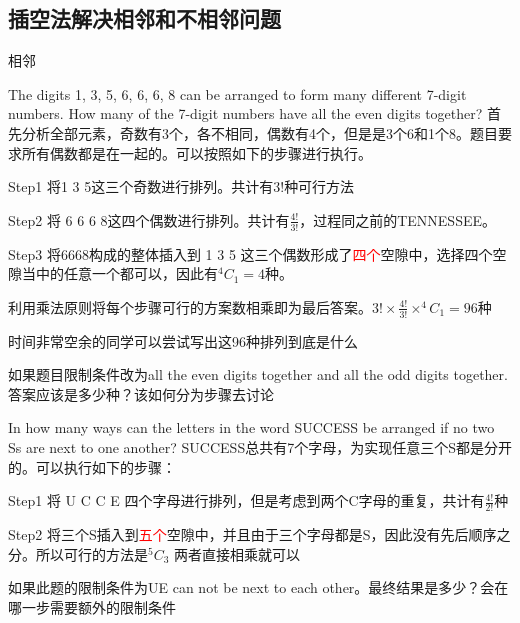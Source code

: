 \subsection*{插空法解决相邻和不相邻问题}
相邻
\begin{ExampleBox}
The digits 1, 3, 5, 6, 6, 6, 8 can be arranged to form many diﬀerent 7-digit numbers. How many of the 7-digit numbers have all the even digits together?
\tcblower
首先分析全部元素，奇数有3个，各不相同，偶数有4个，但是是3个6和1个8。题目要求所有偶数都是在一起的。可以按照如下的步骤进行执行。

Step1 将1 3 5这三个奇数进行排列。共计有$3!$种可行方法

Step2 将 6 6 6 8这四个偶数进行排列。共计有$\frac{4!}{3!}$，过程同之前的TENNESSEE。

Step3 将6668构成的整体插入到 1 3 5 这三个偶数形成了\textcolor{red}{四个}空隙中，选择四个空隙当中的任意一个都可以，因此有$^4C_1=4$种。

利用乘法原则将每个步骤可行的方案数相乘即为最后答案。$3!\times \frac{4!}{3!}\times ^4C_1=96$种
\end{ExampleBox}
时间非常空余的同学可以尝试写出这96种排列到底是什么

\begin{TaskBox}
如果题目限制条件改为all the even digits together and all the odd digits together. 答案应该是多少种？该如何分为步骤去讨论
\end{TaskBox}

\begin{ExampleBox}
In how many ways can the letters in the word SUCCESS be arranged if no two Ss are next to one another?
\tcblower
SUCCESS总共有7个字母，为实现任意三个S都是分开的。可以执行如下的步骤：

Step1 将 U C C E 四个字母进行排列，但是考虑到两个C字母的重复，共计有$\frac{4!}{2!}$种

Step2 将三个S插入到\textcolor{red}{五个}空隙中，并且由于三个字母都是S，因此没有先后顺序之分。所以可行的方法是$^5C_3$
两者直接相乘就可以
\end{ExampleBox}

\begin{TaskBox}
如果此题的限制条件为UE can not be next to each other。最终结果是多少？会在哪一步需要额外的限制条件
\end{TaskBox}


